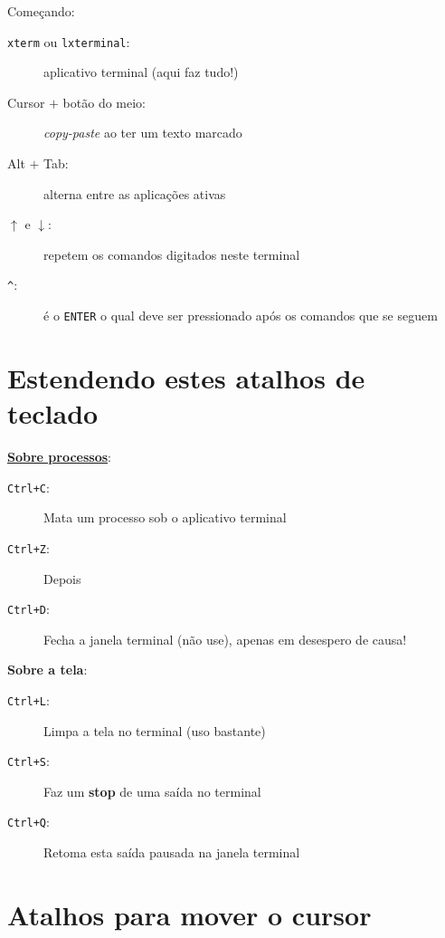 \documentclass[final,a4paper]{article}
\begin{document}
Começando:
\begin{description}


\item[\texttt{xterm} ou \texttt{lxterminal}:] aplicativo terminal (aqui faz tudo!)
\item[Cursor $+$ botão do meio:]  \textit{copy-paste} ao ter um texto marcado
\item[Alt $+$ Tab:] alterna entre as aplicações ativas

\item[$\uparrow $ e $\downarrow $:] repetem os comandos digitados neste terminal
\item[\texttt{\^}: ] é o \texttt{ENTER} o qual deve ser pressionado após os comandos
que se seguem

\end{description}


\section{Estendendo estes atalhos de teclado}

\underline{\textbf{Sobre processos}}:
\begin{description}
\item[\texttt{Ctrl+C}:] Mata um processo sob o aplicativo terminal
\item[\texttt{Ctrl+Z}:] Depois
\item[\texttt{Ctrl+D}:] Fecha a janela terminal (não use), apenas em 
desespero de causa!
\end{description}

\textbf{\textbf{Sobre a tela}}:
\begin{description}
\item[\texttt{Ctrl+L}:] Limpa a tela no terminal (uso bastante)
\item[\texttt{Ctrl+S}:] Faz um \textbf{stop} de uma saída no terminal
\item[\texttt{Ctrl+Q}:] Retoma esta saída pausada na janela terminal \end{description}


\section{Atalhos para mover o cursor}
\end{document}
